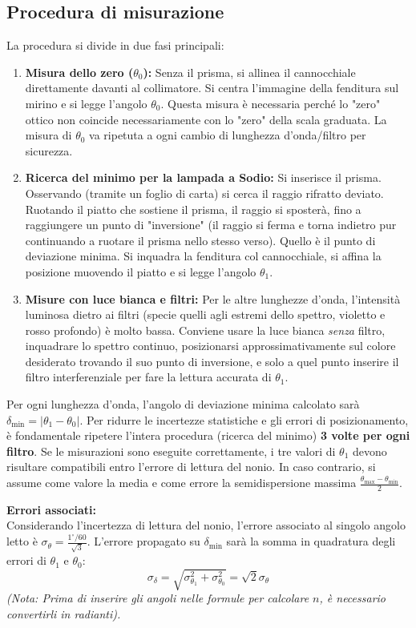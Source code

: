 \documentclass[openany,a4paper,12pt]{book}
\begin{document}
\subsection*{Procedura di misurazione}
La procedura si divide in due fasi principali:
\begin{enumerate}
    \item \textbf{Misura dello zero ($\theta_0$):} Senza il prisma, si allinea il cannocchiale direttamente davanti al collimatore. Si centra l'immagine della fenditura sul mirino e si legge l'angolo $\theta_0$. Questa misura è necessaria perché lo "zero" ottico non coincide necessariamente con lo "zero" della scala graduata. La misura di $\theta_0$ va ripetuta a ogni cambio di lunghezza d'onda/filtro per sicurezza.
    \item \textbf{Ricerca del minimo per la lampada a Sodio:} Si inserisce il prisma. Osservando (tramite un foglio di carta) si cerca il raggio rifratto deviato. Ruotando il piatto che sostiene il prisma, il raggio si sposterà, fino a raggiungere un punto di "inversione" (il raggio si ferma e torna indietro pur continuando a ruotare il prisma nello stesso verso). Quello è il punto di deviazione minima. Si inquadra la fenditura col cannocchiale, si affina la posizione muovendo il piatto e si legge l'angolo $\theta_1$.
    \item \textbf{Misure con luce bianca e filtri:} Per le altre lunghezze d'onda, l'intensità luminosa dietro ai filtri (specie quelli agli estremi dello spettro, violetto e rosso profondo) è molto bassa. Conviene usare la luce bianca \textit{senza} filtro, inquadrare lo spettro continuo, posizionarsi approssimativamente sul colore desiderato trovando il suo punto di inversione, e solo a quel punto inserire il filtro interferenziale per fare la lettura accurata di $\theta_1$.
\end{enumerate}

Per ogni lunghezza d'onda, l'angolo di deviazione minima calcolato sarà $\delta_{\text{min}} = |\theta_1 - \theta_0|$.
Per ridurre le incertezze statistiche e gli errori di posizionamento, è fondamentale ripetere l'intera procedura (ricerca del minimo) \textbf{3 volte per ogni filtro}. Se le misurazioni sono eseguite correttamente, i tre valori di $\theta_1$ devono risultare compatibili entro l'errore di lettura del nonio. In caso contrario, si assume come valore la media e come errore la semidispersione massima $\frac{\theta_{\text{max}} - \theta_{\text{min}}}{2}$.

\textbf{Errori associati:}\\
Considerando l'incertezza di lettura del nonio, l'errore associato al singolo angolo letto è $\sigma_{\theta} = \frac{1^\circ/60}{\sqrt{3}}$.
L'errore propagato su $\delta_{\text{min}}$ sarà la somma in quadratura degli errori di $\theta_1$ e $\theta_0$:
\begin{equation}
    \sigma_{\delta} = \sqrt{\sigma_{\theta_1}^2 + \sigma_{\theta_0}^2} = \sqrt{2}\sigma_{\theta}
\end{equation}
\textit{(Nota: Prima di inserire gli angoli nelle formule per calcolare $n$, è necessario convertirli in radianti).}
\end{document}
